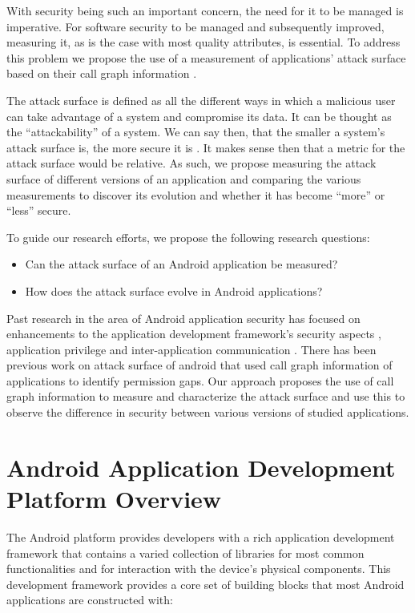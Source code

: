\documentclass[conference]{IEEEtran}
\begin{document}
With security being such an important concern, the need for it to be managed is imperative. For software security to be managed and subsequently improved, measuring it, as is the case with most quality attributes, is essential. To address this problem we propose the use of a measurement of applications' attack surface based on their call graph information \cite{Manadhata2011AnAttackSurfaceMetric}.

The attack surface is defined as all the different ways in which a malicious user can take advantage of a system and compromise its data. It can be thought as the “attackability” of a system. We can say then, that the smaller a system's attack surface is, the more secure it is \cite{Manadhata2011AnAttackSurfaceMetric}. It makes sense then that a metric for the attack surface would be relative. As such, we propose measuring the attack surface of different versions of an application and comparing the various measurements to discover its evolution and whether it has become “more” or “less” secure.

To guide our research efforts, we propose the following research questions:

\begin{itemize}
  \item Can the attack surface of an Android application be measured?
  \item How does the attack surface evolve in Android applications?
\end{itemize}

Past research in the area of Android application security has focused on enhancements to the application development framework's security aspects \cite{ongtang_semantically_2012}, application privilege \cite{bugiel2012towards} and inter-application communication \cite{chin_analyzing_2011}. There has been previous work on attack surface of android \cite{bartel_automatically_2012} that used call graph information of applications to identify permission gaps. Our approach proposes the use of call graph information to measure and characterize the attack surface and use this to observe the difference in security between various versions of studied applications.

\section{Android Application Development Platform Overview}

The Android platform provides developers with a rich application development framework that contains a varied collection of libraries for most common functionalities and for interaction with the device's physical components. This development framework provides a core set of building blocks that most Android applications are constructed with:
\end{document}
